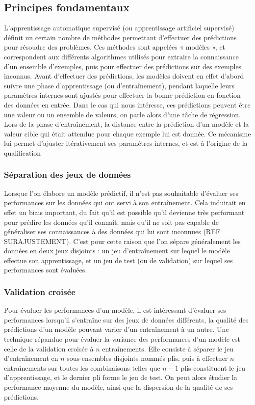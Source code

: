 \subsection{Principes fondamentaux}

L'apprentissage automatique supervisé (ou apprentissage artificiel supervisé) définit un certain nombre de méthodes permettant d'effectuer des prédictions pour résoudre des problèmes. Ces méthodes sont appelées « modèles », et correspondent aux différents algorithmes utilisés pour extraire la connaissance d'un ensemble d'exemples, puis pour effectuer des prédictions sur des exemples inconnus. Avant d'effectuer des prédictions, les modèles doivent en effet d'abord suivre une phase d'apprentissage (ou d'entraînement), pendant laquelle leurs paramètres internes sont ajustés pour effectuer la bonne prédiction en fonction des données en entrée. Dans le cas qui nous intéresse, ces prédictions peuvent être une valeur ou un ensemble de valeurs, on parle alors d'une tâche de régression. Lors de la phase d'entraînement, la distance entre la prédiction d'un modèle et la valeur cible qui était attendue pour chaque exemple lui est donnée. Ce mécanisme lui permet d'ajuster itérativement ses paramètres internes, et est à l'origine de la qualification  

\subsubsection{Séparation des jeux de données}
\par Lorsque l'on élabore un modèle prédictif, il n'est pas souhaitable d'évaluer ses performances sur les données qui ont servi à son entraînement. Cela induirait en effet un biais important, du fait qu'il est possible qu'il devienne très performant pour prédire les données qu'il connaît, mais qu'il ne soit pas capable de généraliser ses connaissances à des données qui lui sont inconnues (REF SURAJUSTEMENT). C'est pour cette raison que l'on sépare généralement les données en deux jeux disjoints : un jeu d'entraînement sur lequel le modèle effectue son apprentissage, et un jeu de test (ou de validation) sur lequel ses performances sont évaluées.

\subsubsection{Validation croisée}
\par Pour évaluer les performances d'un modèle, il est intéressant d'évaluer ses performances lorsqu'il s'entraîne sur des jeux de données différents, la qualité des prédictions d'un modèle pouvant varier d'un entraînement à un autre. Une technique répandue pour évaluer la variance des performances d'un modèle est celle de la validation croisée à $n$ entraînements. Elle consiste à séparer le jeu d'entraînement en $n$ sous-ensembles disjoints nommés plis, puis à effectuer $n$ entraînements sur toutes les combinaisons telles que $n-1$ plis constituent le jeu d'apprentissage, et le dernier pli forme le jeu de test. On peut alors étudier la performance moyenne du modèle, ainsi que la dispersion de la qualité de ses prédictions.



